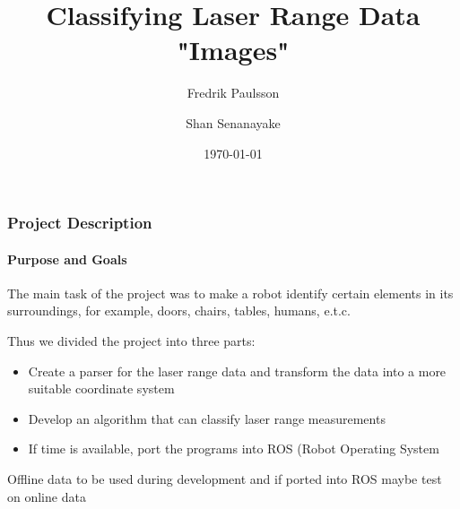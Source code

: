 \documentclass{beamer}
\title[Classifying Laser Range Data "Images"] %
{Classifying Laser Range Data "Images"}
\author[F. Paulsson, S. Senanayake]%
{Fredrik Paulsson \and Shan Senanayake}
\institute[LTH] %
{Lund University \\ Faculty of Engineering}
\date[\today] %
{\today}
\begin{document}
\frame{\titlepage}

\begin{frame}
\frametitle{Project Description}
\framesubtitle{Purpose and Goals}

The main task of the project was to make a robot identify certain elements in its surroundings, for example, doors, chairs, tables, humans, e.t.c.

\vspace{10pt}

Thus we divided the project into three parts:

\begin{itemize}
  \item{Create a parser for the laser range data and transform the data into a more suitable coordinate system}
  \item{Develop an algorithm that can classify laser range measurements}
  \item{If time is available, port the programs into ROS (Robot Operating System}
\end{itemize}

Offline data to be used during development and if ported into ROS maybe test on online data

\end{frame}
\end{document}

